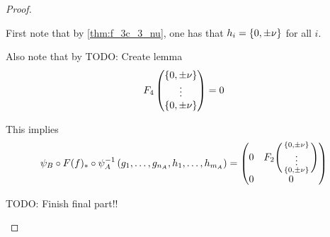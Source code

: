 \begin{proof}
\begin{enumerate}
{            First note that by \autoref{thm:f_3c_3_nu}, one has that \( h_i = \left\{ 0, \pm \nu \right\} \) for all \( i \).

            Also note that by TODO: Create lemma
            \[
                F_4 \begin{pmatrix}
                    \left\{ 0, \pm \nu \right\} \\
                    \vdots \\
                    \left\{ 0, \pm \nu \right\}
                \end{pmatrix} = 0
            \]

            This implies
            \[
                \psi_B \circ F(f)_* \circ \psi_A^{-1} \left( g_1, \dots, g_{n_A}, h_1, \dots, h_{m_A} \right) = \begin{pmatrix}
                    0 & F_2 \begin{psmallmatrix}
                        \left\{ 0, \pm \nu \right\} \\
                        \vdots \\
                        \left\{ 0, \pm \nu \right\}
                    \end{psmallmatrix} \\
                    0 & 0
                \end{pmatrix}
            \]

            TODO: Finish final part!!





}
\end{enumerate}
\end{proof}
